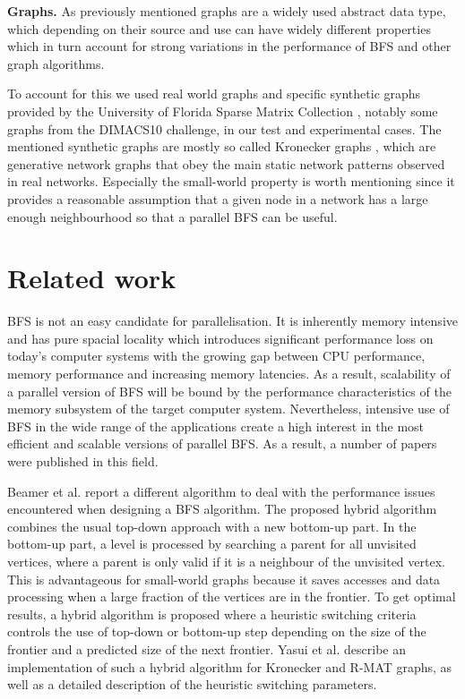 \documentclass[letterpaper]{article}
\newcommand{\mypar}[1]{{\bf #1.}} %
\begin{document}
	
	\mypar{Graphs}
	As previously mentioned graphs are a widely used abstract data type, which depending on their source and use can have widely different properties which in turn account for strong variations in the performance of BFS and other graph algorithms.
	
	To account for this we used real world graphs and specific synthetic graphs provided by the University of Florida Sparse Matrix Collection \cite{SparseMatrixCollection}, notably some graphs from the DIMACS10 challenge, in our test and experimental cases.
	The mentioned synthetic graphs are mostly so called Kronecker graphs \cite{Leskovec:2010:KGA:1756006.1756039}, which are generative network graphs that obey the main static network patterns observed in real networks.
	Especially the small-world property is worth mentioning since it provides a reasonable assumption that a given node in a network has a large enough neighbourhood so that a parallel BFS can be useful.	
	


	\section{Related work} \label{sec:rewo} %
		BFS is not an easy candidate for parallelisation.
		It is inherently memory intensive and has pure spacial locality which introduces significant performance loss on today's computer systems with the growing gap between CPU performance, memory performance and increasing memory latencies.
		As a result, scalability of a parallel version of BFS will be bound by the performance characteristics of the memory subsystem of the target computer system. 
		Nevertheless, intensive use of BFS in the wide range of the applications create a high interest in the most efficient and scalable versions of parallel BFS.
		As a result, a number of papers were published in this field. 
		
		Beamer et al.\cite{beamer2011searching} report a different algorithm to deal with the performance issues encountered when designing a BFS algorithm. 
		The proposed hybrid algorithm combines the usual top-down approach with a new bottom-up part. 
		In the bottom-up part, a level is processed by searching a parent for all unvisited vertices, where a parent is only valid if it is a neighbour of the unvisited vertex. 
		This is advantageous for small-world graphs because it saves accesses and data processing when a large fraction of the vertices are in the frontier. 
		To get optimal results, a hybrid algorithm is proposed where a heuristic switching criteria controls the use of top-down or bottom-up step depending on the size of the frontier and a predicted size of the next frontier. 
		Yasui et al.\cite{6691600} describe an implementation of such a hybrid algorithm for Kronecker and R-MAT graphs, as well as a detailed description of the heuristic switching parameters.
	
\end{document}
